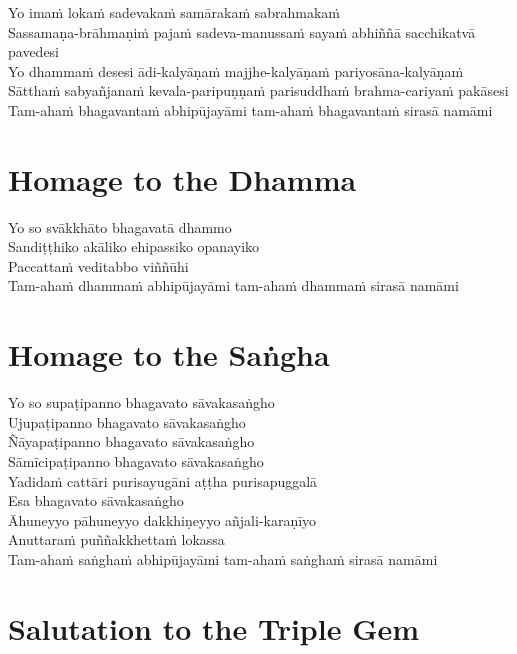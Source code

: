 Yo imaṁ lokaṁ sadevakaṁ samārakaṁ sabrahmakaṁ\\
Sassamaṇa-brāhmaṇiṁ pajaṁ sadeva-manussaṁ sayaṁ abhiññā sacchikatvā pavedesi\\
Yo dhammaṁ desesi ādi-kalyāṇaṁ majjhe-kalyāṇaṁ pariyosāna-kalyāṇaṁ\\
Sātthaṁ sabyañjanaṁ kevala-paripuṇṇaṁ parisuddhaṁ brahma-cariyaṁ pakāsesi\\
Tam-ahaṁ bhagavantaṁ abhipūjayāmi tam-ahaṁ bhagavantaṁ sirasā namāmi

\section*{Homage to the Dhamma}

\begin{leader}
\end{leader}

Yo so svākkhāto bhagavatā dhammo\\
Sandiṭṭhiko akāliko ehipassiko opanayiko\\
Paccattaṁ veditabbo viññūhi\\
Tam-ahaṁ dhammaṁ abhipūjayāmi tam-ahaṁ dhammaṁ sirasā namāmi

\section*{Homage to the Saṅgha}

\enlargethispage{\baselineskip}

\begin{leader}
\end{leader}

Yo so supaṭipanno bhagavato sāvakasaṅgho\\
Ujupaṭipanno bhagavato sāvakasaṅgho\\
Ñāyapaṭipanno bhagavato sāvakasaṅgho\\
Sāmīcipaṭipanno bhagavato sāvakasaṅgho\\
Yadidaṁ cattāri purisayugāni aṭṭha purisapuggalā\\
Esa bhagavato sāvakasaṅgho\\
Āhuneyyo pāhuneyyo dakkhiṇeyyo añjali-karaṇīyo\\
Anuttaraṁ puññakkhettaṁ lokassa\\
Tam-ahaṁ saṅghaṁ abhipūjayāmi tam-ahaṁ saṅghaṁ sirasā namāmi

\section*{Salutation to the Triple Gem}

